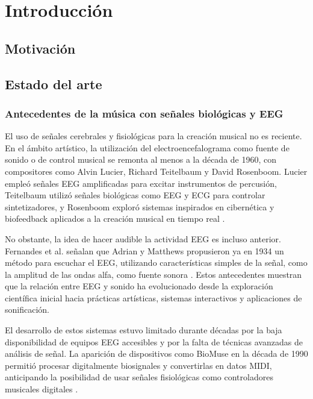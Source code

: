 \documentclass[../main.tex]{subfiles}
\begin{document}
\vspace{48pt}

\section{Introducción}

\subsection{Motivación}

\subsection{Estado del arte}

\subsubsection{Antecedentes de la música con señales biológicas y EEG}

El uso de señales cerebrales y fisiológicas para la creación musical no es reciente. En el ámbito artístico, la utilización del electroencefalograma como fuente de sonido o de control musical se remonta al menos a la década de 1960, con compositores como Alvin Lucier, Richard Teitelbaum y David Rosenboom. Lucier empleó señales EEG amplificadas para excitar instrumentos de percusión, Teitelbaum utilizó señales biológicas como EEG y ECG para controlar sintetizadores, y Rosenboom exploró sistemas inspirados en cibernética y biofeedback aplicados a la creación musical en tiempo real \cite{MirandaCastet2014Preface}.

No obstante, la idea de hacer audible la actividad EEG es incluso anterior. Fernandes et al. señalan que Adrian y Matthews propusieron ya en 1934 un método para escuchar el EEG, utilizando características simples de la señal, como la amplitud de las ondas alfa, como fuente sonora \cite{Fernandes2021BraiNSy}. Estos antecedentes muestran que la relación entre EEG y sonido ha evolucionado desde la exploración científica inicial hacia prácticas artísticas, sistemas interactivos y aplicaciones de sonificación.

El desarrollo de estos sistemas estuvo limitado durante décadas por la baja disponibilidad de equipos EEG accesibles y por la falta de técnicas avanzadas de análisis de señal. La aparición de dispositivos como BioMuse en la década de 1990 permitió procesar digitalmente biosignales y convertirlas en datos MIDI, anticipando la posibilidad de usar señales fisiológicas como controladores musicales digitales \cite{MirandaCastet2014Preface}.
\end{document}
